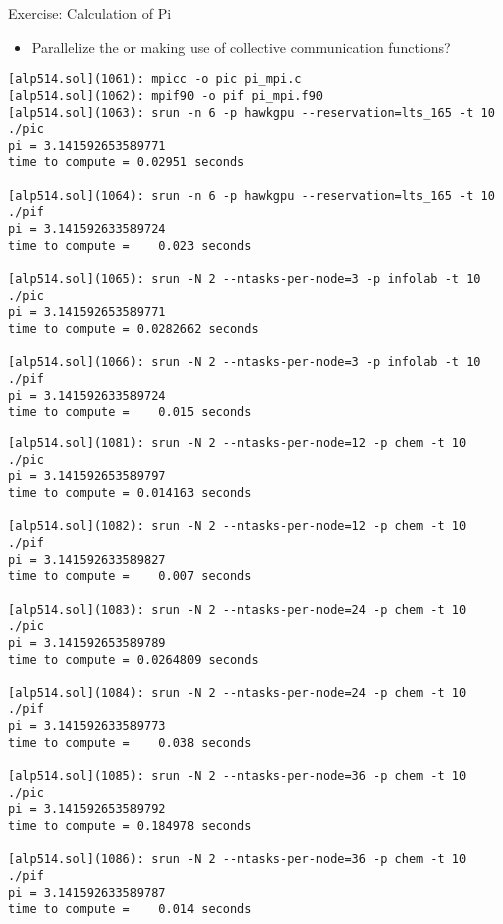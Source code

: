 \documentclass[9pt,c]{beamer}
\begin{document}
\begin{frame}{Exercise: Calculation of Pi}
  \begin{itemize}
    \item Parallelize the  or  making use of collective communication functions?
  \end{itemize}
  \begin{exampleblock}{}
    \begin{lstlisting}[basicstyle=\scriptsize\ttfamily]
[alp514.sol](1061): mpicc -o pic pi_mpi.c
[alp514.sol](1062): mpif90 -o pif pi_mpi.f90
[alp514.sol](1063): srun -n 6 -p hawkgpu --reservation=lts_165 -t 10 ./pic
pi = 3.141592653589771
time to compute = 0.02951 seconds

[alp514.sol](1064): srun -n 6 -p hawkgpu --reservation=lts_165 -t 10 ./pif
pi = 3.141592633589724
time to compute =    0.023 seconds

[alp514.sol](1065): srun -N 2 --ntasks-per-node=3 -p infolab -t 10  ./pic
pi = 3.141592653589771
time to compute = 0.0282662 seconds

[alp514.sol](1066): srun -N 2 --ntasks-per-node=3 -p infolab -t 10  ./pif
pi = 3.141592633589724
time to compute =    0.015 seconds
    \end{lstlisting}
  \end{exampleblock}
  \framebreak
  \begin{exampleblock}{}
    \begin{lstlisting}[basicstyle=\scriptsize\ttfamily]
[alp514.sol](1081): srun -N 2 --ntasks-per-node=12 -p chem -t 10  ./pic
pi = 3.141592653589797
time to compute = 0.014163 seconds

[alp514.sol](1082): srun -N 2 --ntasks-per-node=12 -p chem -t 10  ./pif
pi = 3.141592633589827
time to compute =    0.007 seconds

[alp514.sol](1083): srun -N 2 --ntasks-per-node=24 -p chem -t 10  ./pic
pi = 3.141592653589789
time to compute = 0.0264809 seconds

[alp514.sol](1084): srun -N 2 --ntasks-per-node=24 -p chem -t 10  ./pif
pi = 3.141592633589773
time to compute =    0.038 seconds

[alp514.sol](1085): srun -N 2 --ntasks-per-node=36 -p chem -t 10  ./pic
pi = 3.141592653589792
time to compute = 0.184978 seconds

[alp514.sol](1086): srun -N 2 --ntasks-per-node=36 -p chem -t 10  ./pif
pi = 3.141592633589787
time to compute =    0.014 seconds
    \end{lstlisting}
  \end{exampleblock}
\end{frame}
\end{document}
